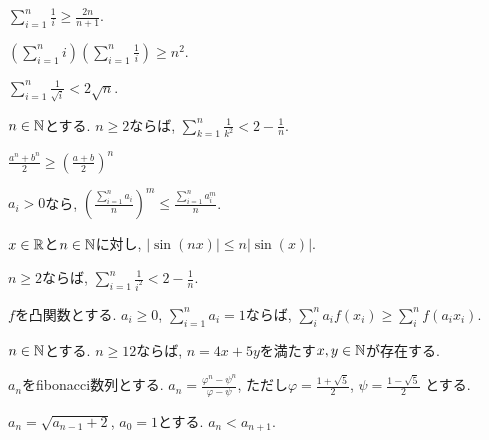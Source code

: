 \begin{prop}
$\sum_{i=1}^{n}\frac{1}{i}\geq \frac{2n}{n+1}$.
\end{prop}

\begin{prop}
$\left(\sum_{i=1}^{n}i\right)\left(\sum_{i=1}^{n}\frac{1}{i}\right)\geq n^2$.
\end{prop}

\begin{prop}
$\sum_{i=1}^{n}\frac{1}{\sqrt{i}}<2\sqrt{n}$.
\end{prop}

\begin{prop}
$n\in\mathbb{N}$とする.
  $n\geq 2$ならば, $\sum_{k=1}^n\frac{1}{k^2} < 2-\frac{1}{n}$.
\end{prop}


\begin{prop}
$\frac{a^n+b^n}{2}\geq \left(\frac{a+b}{2}\right)^n$
\end{prop}

\begin{prop}
  $a_i>0$なら,
  $\left(\frac{\sum_{i=1}^n a_i}{n}\right)^m \leq \frac{\sum_{i=1}^{n}a_i^m}{n}$.
\end{prop}

\begin{prop}
$x\in\mathbb{R}$と$n\in\mathbb{N}$に対し, $|\sin(nx)|\leq n|\sin(x)|$.
\end{prop}

\begin{prop}
  $n\geq 2$ならば,
  $\sum_{i=1}^{n}\frac{1}{i^2}<2-\frac{1}{n}$.
\end{prop}

\begin{prop}
  $f$を凸関数とする.
  $a_i\geq 0$, $\sum_{i=1}^n a_i=1$ならば,
  $\sum_{i}^{n} a_i f(x_i)\geq \sum_{i}^{n}  f(a_i x_i)$.
\end{prop}




\begin{prop}
$n\in\mathbb{N}$とする.
  $n\geq 12$ならば, $n=4x+5y$を満たす$x,y\in\mathbb{N}$が存在する.
\end{prop}


\begin{prop}
  $a_n$をfibonacci数列とする.
  $a_n=\frac{\varphi^n-\psi^n}{\varphi-\psi}$,
  ただし$\varphi=\frac{1+\sqrt{5}}{2}$,
  $\psi=\frac{1-\sqrt{5}}{2}$
  とする.
\end{prop}

\begin{prop}
  $a_n=\sqrt{a_{n-1}+2}$, $a_0=1$とする.
  $a_n<a_{n+1}$.
\end{prop}



